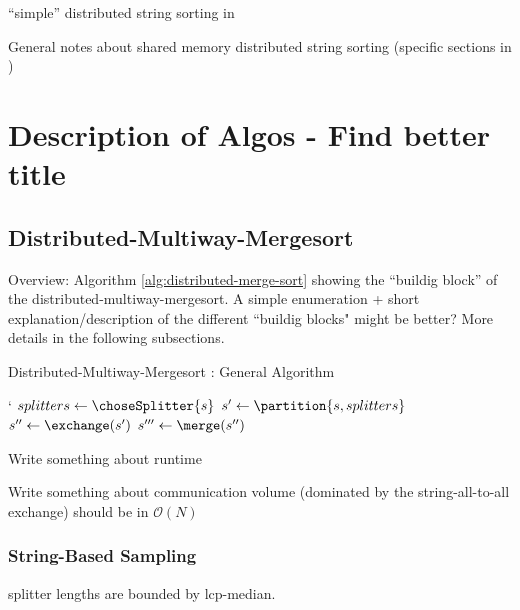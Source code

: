 \documentclass[12pt,a4paper,twoside]{scrartcl}
\numberwithin{equation}{section}
\begin{document}
``simple'' distributed string sorting in \cite{fischer2019lightweight}

General notes about shared memory distributed string sorting (specific sections in \cite{bingmann2018scalable})


\section{Description of Algos - Find better title}

\subsection{Distributed-Multiway-Mergesort}

Overview: Algorithm \ref{alg:distributed-merge-sort} showing the ``buildig block'' of the distributed-multiway-mergesort. A simple enumeration + short explanation/description of the different ``buildig blocks" might be better? More details in the following subsections.

\begin{algorithm}
	\caption{Distributed-Multiway-Mergesort : General Algorithm}\label{alg:distributed-merge-sort}
	`
	\BlankLine
	 
	$splitters \leftarrow \choseSplitter{s}$ 
	$s' \leftarrow \partition{s, splitters}$ 
	$s'' \leftarrow \exchange(s')$ \; 
	$s''' \leftarrow \merge(s'')$
	
	
\end{algorithm}

Write something about runtime 

Write something about communication volume (dominated by the string-all-to-all exchange) should be in $\mathcal{O}(N)$


\subsubsection{String-Based Sampling}

splitter lengths are bounded by lcp-median.
\end{document}

